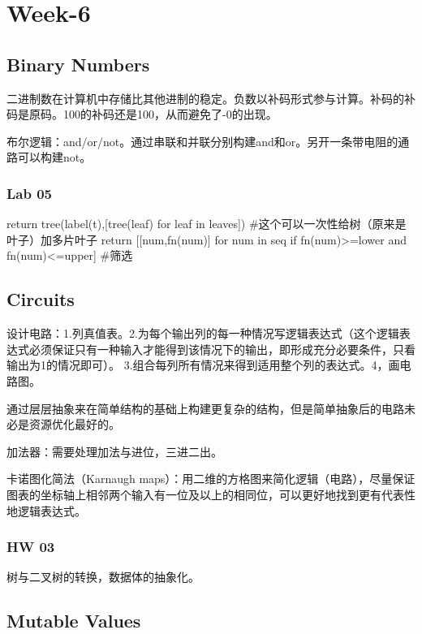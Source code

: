 \documentclass{ctexart}
\begin{document}
\section{Week-6}

\subsection{Binary Numbers}

二进制数在计算机中存储比其他进制的稳定。负数以补码形式参与计算。补码的补码是原码。100的补码还是100，从而避免了-0的出现。

布尔逻辑：and/or/not。通过串联和并联分别构建and和or。另开一条带电阻的通路可以构建not。

\subsubsection{Lab 05}

\begin{python}
    return tree(label(t),[tree(leaf) for leaf in leaves])
    #这个可以一次性给树（原来是叶子）加多片叶子
    return [[num,fn(num)] for num in seq if fn(num)>=lower and fn(num)<=upper]
    #筛选
\end{python}

\subsection{Circuits}

设计电路：1.列真值表。2.为每个输出列的每一种情况写逻辑表达式（这个逻辑表达式必须保证只有一种输入才能得到该情况下的输出，即形成充分必要条件，只看输出为1的情况即可）。
3.组合每列所有情况来得到适用整个列的表达式。4，画电路图。

通过层层抽象来在简单结构的基础上构建更复杂的结构，但是简单抽象后的电路未必是资源优化最好的。

加法器：需要处理加法与进位，三进二出。

卡诺图化简法（Karnaugh maps）：用二维的方格图来简化逻辑（电路），尽量保证图表的坐标轴上相邻两个输入有一位及以上的相同位，可以更好地找到更有代表性地逻辑表达式。

\subsubsection{HW 03}

树与二叉树的转换，数据体的抽象化。

\subsection{Mutable Values}
\end{document}
